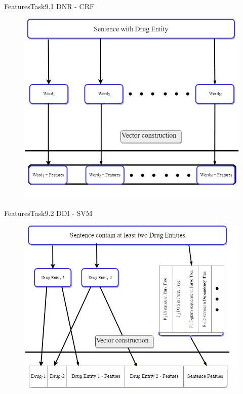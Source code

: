 \documentclass[xcolor=table]{beamer}
\begin{document}

\begin{frame}{Features}{Task9.1 DNR - CRF}
\begin{figure}
\includegraphics[scale=0.3]{CRF.png}
\end{figure}
\end{frame}



\begin{frame}{Features}{Task9.2 DDI - SVM}
\begin{figure}
\includegraphics[scale=0.3]{DDI.png}
\end{figure}
\end{frame}
\end{document}
